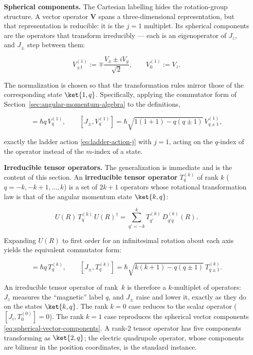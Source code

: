 \medskip\noindent\textbf{Spherical components.} The Cartesian labelling hides the rotation-group structure. A vector operator $\bm V$ spans a three-dimensional representation, but that representation is reducible: it is the $j=1$ multiplet. Its spherical components are the operators that transform irreducibly --- each is an eigenoperator of $J_z$, and $J_\pm$ step between them:
\begin{linenomath}
\begin{equation}
V^{(1)}_{\pm 1} := \mp\frac{V_x \pm iV_y}{\sqrt{2}}, \qquad V^{(1)}_0 := V_z .
\label{eq:spherical-vector-components}
\end{equation}
\end{linenomath}
The normalization is chosen so that the transformation rules mirror those of the corresponding state $\ket{1,q}$. Specifically, applying the commutator form of Section~\ref{sec:angular-momentum-algebra} to the definitions,
\begin{linenomath}
\begin{equation*}
[J_z, V^{(1)}_q] = \hbar q\,V^{(1)}_q, \qquad
[J_\pm, V^{(1)}_q] = \hbar\sqrt{1(1+1)-q(q\pm1)}\,V^{(1)}_{q\pm1},
\end{equation*}
\end{linenomath}
exactly the ladder action \eqref{eq:ladder-action-j} with $j=1$, acting on the $q$-index of the operator instead of the $m$-index of a state.

\medskip\noindent\textbf{Irreducible tensor operators.} The generalization is immediate and is the content of this section. An \textbf{irreducible tensor operator} $T^{(k)}_q$ of rank $k$ ($q = -k,-k+1,\ldots,k$) is a set of $2k+1$ operators whose rotational transformation law is that of the angular momentum state $\ket{k,q}$:
\begin{linenomath}
\begin{equation}
U(R)\,T^{(k)}_q\,U(R)^\dagger = \sum_{q'=-k}^{k} T^{(k)}_{q'}\,D^{(k)}_{q'q}(R) .
\label{eq:tensor-operator-def-integral}
\end{equation}
\end{linenomath}
Expanding $U(R)$ to first order for an infinitesimal rotation about each axis yields the equivalent commutator form:
\begin{linenomath}
\begin{equation}
[J_z, T^{(k)}_q] = \hbar q\,T^{(k)}_q, \qquad
[J_\pm, T^{(k)}_q] = \hbar\sqrt{k(k+1)-q(q\pm1)}\,T^{(k)}_{q\pm1}.
\label{eq:tensor-operator-def}
\end{equation}
\end{linenomath}
An irreducible tensor operator of rank~$k$ is therefore a $k$-multiplet of operators: $J_z$ measures the ``magnetic'' label $q$, and $J_\pm$ raise and lower it, exactly as they do on the states $\ket{k,q}$. The rank $k=0$ case reduces to the scalar operator ($[J_i, T^{(0)}_0] = 0$). The rank $k=1$ case reproduces the spherical vector components \eqref{eq:spherical-vector-components}. A rank-$2$ tensor operator has five components transforming as $\ket{2,q}$; the electric quadrupole operator, whose components are bilinear in the position coordinates, is the standard instance.

